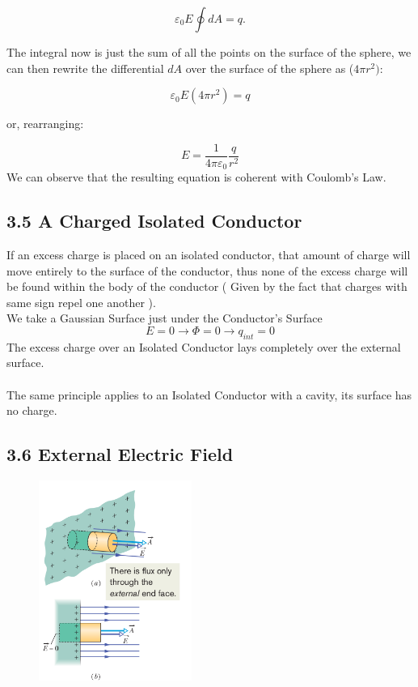 \documentclass[12pt, a4paper]{article}
\begin{document}
		\begin{equation*}
			\varepsilon_0 E \oint dA = q.
		\end{equation*}
	
		The integral now is just the sum of all the points on the surface of the sphere, we can then rewrite the differential $dA$ over the surface of the sphere as ($4\pi r^2)$:
		
		\begin{equation*}
			\varepsilon_0 E (4\pi r^2) = q
		\end{equation*}
	
		or, rearranging:
		
		\begin{equation*}
			E = \frac{1}{4\pi\varepsilon_0} \frac{q}{r^2}
			\tag{3-8}
		\end{equation*}
		We can observe that the resulting equation is coherent with Coulomb's Law.


		
		\subsection*{3.5 A Charged Isolated Conductor}

		If an excess charge is placed on an isolated conductor, that amount of charge will move entirely to the surface of the conductor, thus none of the excess charge will be found within the body of the conductor ( Given by the fact that charges with same sign repel one another ).\\
		We take a Gaussian Surface just under the Conductor's Surface \\
		\begin{equation*}
			E = 0 \rightarrow \Phi = 0 \rightarrow q_{int} = 0 
		\end{equation*}
		The excess charge over an Isolated Conductor lays completely over the external surface.  \\\\
		The same principle applies to an Isolated Conductor with a cavity, its surface has no  charge.
		
		
		\subsection*{3.6 External Electric Field}
		
		
		\begin{figure}
			\centering
			\includegraphics[width=5cm]{Physics2_PNGs/external-elec-field.png}
			\caption*{}
			\label{fig:external-elec-field.png}
		\end{figure}
		
\end{document}
